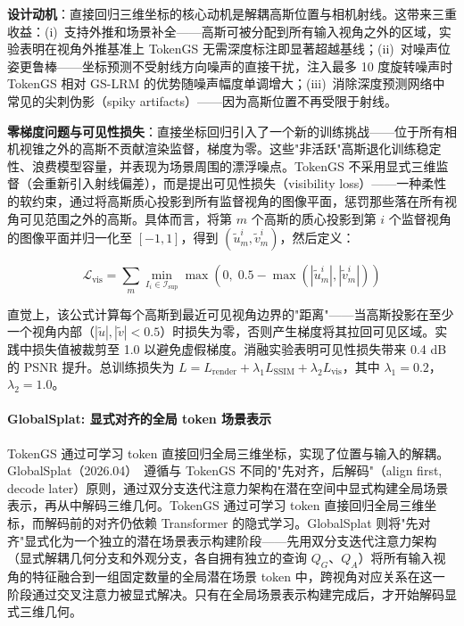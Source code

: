 \textbf{设计动机}：直接回归三维坐标的核心动机是解耦高斯位置与相机射线。这带来三重收益：(i)~支持外推和场景补全——高斯可被分配到所有输入视角之外的区域，实验表明在视角外推基准上 TokenGS 无需深度标注即显著超越基线；(ii)~对噪声位姿更鲁棒——坐标预测不受射线方向噪声的直接干扰，注入最多 10 度旋转噪声时 TokenGS 相对 GS-LRM 的优势随噪声幅度单调增大；(iii)~消除深度预测网络中常见的尖刺伪影（spiky artifacts）——因为高斯位置不再受限于射线。

\textbf{零梯度问题与可见性损失}：直接坐标回归引入了一个新的训练挑战——位于所有相机视锥之外的高斯不贡献渲染监督，梯度为零。这些"非活跃"高斯退化训练稳定性、浪费模型容量，并表现为场景周围的漂浮噪点。TokenGS 不采用显式三维监督（会重新引入射线偏差），而是提出可见性损失（visibility loss）——一种柔性的软约束，通过将高斯质心投影到所有监督视角的图像平面，惩罚那些落在所有视角可见范围之外的高斯。具体而言，将第 $m$ 个高斯的质心投影到第 $i$ 个监督视角的图像平面并归一化至 $[-1, 1]$，得到 $(\tilde{u}_m^i, \tilde{v}_m^i)$，然后定义：

\begin{equation}
\mathcal{L}_{\text{vis}} = \sum_m \min_{I_i \in \mathcal{I}_{\text{sup}}} \max\!\left(0,\; 0.5 - \max(|\tilde{u}_m^i|, |\tilde{v}_m^i|)\right)
\end{equation}

直觉上，该公式计算每个高斯到最近可见视角边界的"距离"——当高斯投影在至少一个视角内部（$|\tilde{u}|, |\tilde{v}| < 0.5$）时损失为零，否则产生梯度将其拉回可见区域。实践中损失值被裁剪至 1.0 以避免虚假梯度。消融实验表明可见性损失带来 0.4 dB 的 PSNR 提升。总训练损失为 $L = L_{\text{render}} + \lambda_1 L_{\text{SSIM}} + \lambda_2 L_{\text{vis}}$，其中 $\lambda_1 = 0.2$，$\lambda_2 = 1.0$。

\paragraph{GlobalSplat: 显式对齐的全局 token 场景表示}

TokenGS 通过可学习 token 直接回归全局三维坐标，实现了位置与输入的解耦。GlobalSplat（2026.04）~\cite{2604_15284}遵循与 TokenGS 不同的"先对齐，后解码"（align first, decode later）原则，通过双分支迭代注意力架构在潜在空间中显式构建全局场景表示，再从中解码三维几何。TokenGS 通过可学习 token 直接回归全局三维坐标，而解码前的对齐仍依赖 Transformer 的隐式学习。GlobalSplat 则将"先对齐"显式化为一个独立的潜在场景表示构建阶段——先用双分支迭代注意力架构（显式解耦几何分支和外观分支，各自拥有独立的查询 $Q_G$、$Q_A$）将所有输入视角的特征融合到一组固定数量的全局潜在场景 token 中，跨视角对应关系在这一阶段通过交叉注意力被显式解决。只有在全局场景表示构建完成后，才开始解码显式三维几何。


